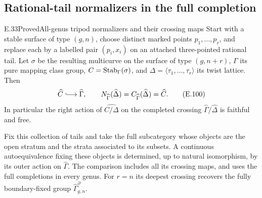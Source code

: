 \subsection{Rational-tail normalizers in the full completion}

\begin{result}{E.33}{Proved}{All-genus tripod normalizers and their crossing maps}
Start with a stable surface of type $(g,n)$, choose distinct
marked points $p_1,\ldots,p_r$, and replace each by a labelled
pair $(p_i,x_i)$ on an attached three-pointed rational tail.
Let $\sigma$ be the resulting multicurve on the surface of
type $(g,n+r)$, $\Gamma$ its pure mapping class group,
$C=\operatorname{Stab}_\Gamma(\sigma)$, and
$\Delta=\langle\tau_1,\ldots,\tau_r\rangle$ its twist lattice.
Then
\[
 \widehat C\lhook\joinrel\longrightarrow\widehat\Gamma,
 \qquad
 N_{\widehat\Gamma}(\widehat\Delta)
   =C_{\widehat\Gamma}(\widehat\Delta)=\widehat C.             \tag{E.100}
\]
In particular the right action of
$\widehat{C/\Delta}$ on the completed crossing
$\widehat\Gamma/\widehat\Delta$ is faithful and free.

Fix this collection of tails and take the full subcategory
whose objects are the open stratum and the strata associated
to its subsets.  A continuous autoequivalence fixing these
objects is determined, up to natural isomorphism, by its
outer action on $\widehat\Gamma$.  The comparison includes
all its crossing maps, and uses the full completions in every
genus.  For $r=n$ its deepest crossing recovers the fully
boundary-fixed group $\widehat\Gamma_{g,n}^{\partial}$.
\end{result}
